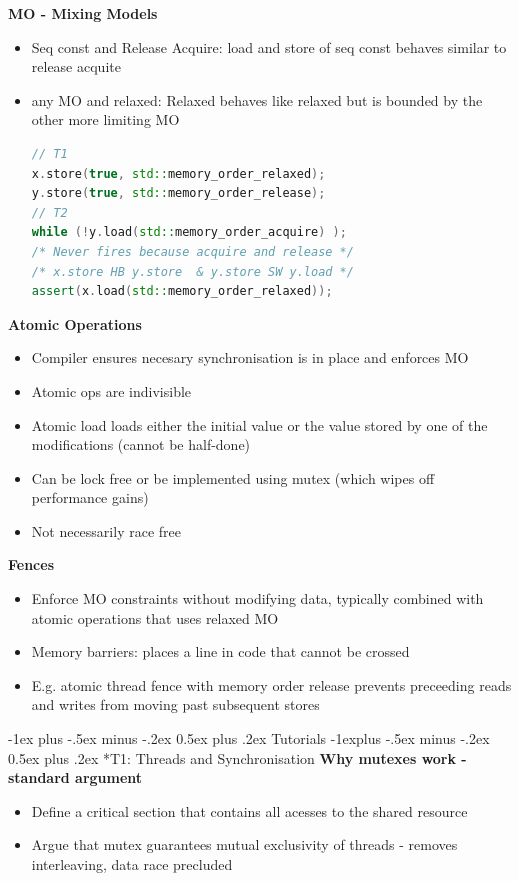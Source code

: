 \documentclass[10pt, landscape]{article}
\makeatletter
\renewcommand{\section}{\@startsection{section}{1}{0mm}%
                                {-1ex plus -.5ex minus -.2ex}%
                                {0.5ex plus .2ex}%
                                {\normalfont\large\bfseries}}
\renewcommand{\subsection}{\@startsection{subsection}{2}{0mm}%
                                {-1explus -.5ex minus -.2ex}%
                                {0.5ex plus .2ex}%
                                {\normalfont\normalsize\bfseries}}
\makeatother
\begin{document}
\begin{multicols}{4}
\textbf{MO - Mixing Models} \\
\begin{itemize}
    \item Seq const and Release Acquire: load and store of seq const behaves similar to release acquite 
    \item any MO and relaxed: Relaxed behaves like relaxed but is bounded by the other more limiting MO 
    \begin{lstlisting}[language=C++]
// T1
x.store(true, std::memory_order_relaxed);
y.store(true, std::memory_order_release);
// T2
while (!y.load(std::memory_order_acquire) );
/* Never fires because acquire and release */
/* x.store HB y.store  & y.store SW y.load */
assert(x.load(std::memory_order_relaxed)); 
    \end{lstlisting}
\end{itemize}

\textbf{Atomic Operations} \\ 
\begin{itemize}
    \item Compiler ensures necesary synchronisation is in place and enforces MO 
    \item Atomic ops are indivisible
    \item Atomic load loads either the initial value or the value stored by one of the modifications (cannot be half-done)
    \item Can be lock free or be implemented using mutex (which wipes off performance gains)
    \item Not necessarily race free
\end{itemize}

\textbf{Fences} \\ 
\begin{itemize}
    \item Enforce MO constraints without modifying data, typically combined with atomic operations that uses relaxed MO
    \item Memory barriers: places a line in code that cannot be crossed 
    \item E.g. atomic thread fence with memory order release prevents preceeding reads and writes from moving past subsequent stores
\end{itemize}

\pagebreak
\section{Tutorials}
\subsection*{T1: Threads and Synchronisation}
\textbf{Why mutexes work - standard argument}\\ 
\begin{itemize}
    \item Define a critical section that contains all acesses to the shared resource 
    \item Argue that mutex guarantees mutual exclusivity of threads - removes interleaving, data race precluded
\end{itemize}


\end{multicols}
\end{document}
